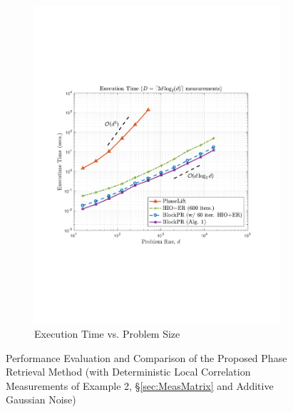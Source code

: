 \begin{figure}[hbtp]
\begin{subfigure}[b]{0.8\textwidth}
\centering
\includegraphics[clip=true, trim = 0.5in 2.5in 0.75in 2.5in,scale=0.55]{pics/fig5b}
\caption{Execution Time vs. Problem Size}
\label{fig:exectime}
\end{subfigure}
\caption{Performance Evaluation and Comparison of the Proposed Phase Retrieval Method 
(with Deterministic Local Correlation Measurements of Example 2, \S \ref{sec:MeasMatrix} and Additive Gaussian Noise)}
\label{fig:performance}
\end{figure}
%

